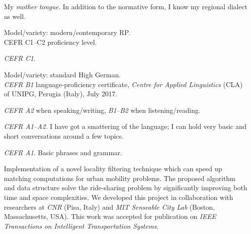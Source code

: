 My {\em mother tongue}. In addition to the normative form, I know my regional dialect as well.

\divider

Model/variety: modern/contemporary RP. \\
CEFR C1--C2 proficiency level.

\divider

{\em CEFR C1}.

\divider

Model/variety: standard High German. \\
{\em CEFR B1} language-proficiency certificate, {\it Centre for Applied Linguistics} (CLA) of UNIPG, Perugia (Italy), July 2017.

\divider

{\em CEFR A2} when speaking/writing, {\em B1--B2} when listening/reading.

\divider

{\em CEFR A1--A2}. I have got a smattering of the language; I can hold very basic and short conversations around a few topics.

\divider

{\em CEFR A1}. Basic phrases and grammar.


\newpage



Implementation of a novel locality filtering technique which can speed up matching computations for urban mobility problems. The proposed algorithm and data structure solve the ride-sharing problem by significantly improving both time and space complexities. We developed this project in collaboration with researchers at {\em CNR} (Pisa, Italy) and {\em MIT Senseable City Lab} (Boston, Massachusetts, USA). This work was accepted for publication on {\em IEEE Transactions on Intelligent Transportation Systems}.

\divider



